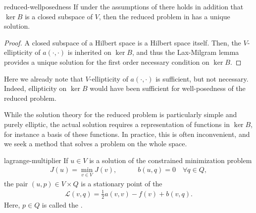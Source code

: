 \begin{Lemma}{reduced-wellposedness}
  If under the assumptions of  there
  holds in addition that $\ker B$ is a closed subspace of $V$, then
  the reduced problem in  has a
  unique solution.
\end{Lemma}

\begin{proof}
  A closed subspace of a Hilbert space is a Hilbert space
  itself. Then, the $V$-ellipticity of $a(\cdot,\cdot)$ is inherited on
  $\ker B$, and thus the Lax-Milgram lemma provides a unique solution
  for the first order necessary condition on $\ker B$.
\end{proof}

\begin{remark}
  Here we already note that $V$-ellipticity of $a(\cdot,\cdot)$ is sufficient,
  but not necessary. Indeed, ellipticity on $\ker B$ would have been
  sufficient for well-posedness of the reduced problem.
\end{remark}

\begin{intro}
  While the solution theory for the reduced problem is particularly
  simple and purely elliptic, the actual solution requires a
  representation of functions in $\ker B$, for instance a basis of
  these functions. In practice, this is often inconvenient, and we
  seek a method that solves a problem on the whole space.
\end{intro}

\begin{Theorem}{lagrange-multiplier}
  If $u\in V$ is a solution of the constrained minimization problem
  \begin{gather*}
    J(u) = \min_{v\in V} J(v), \quad\qquad
    b(u,q) = 0 \quad\forall q\in Q,
  \end{gather*}
  the pair $(u,p)\in V\times Q$ is a stationary point of
  the 
  \begin{gather}
    \mathscr{L}(v,q) = \tfrac12 a(v,v) - f(v) + b(v,q).
  \end{gather}
  Here, $p\in Q$ is called the .
\end{Theorem}

